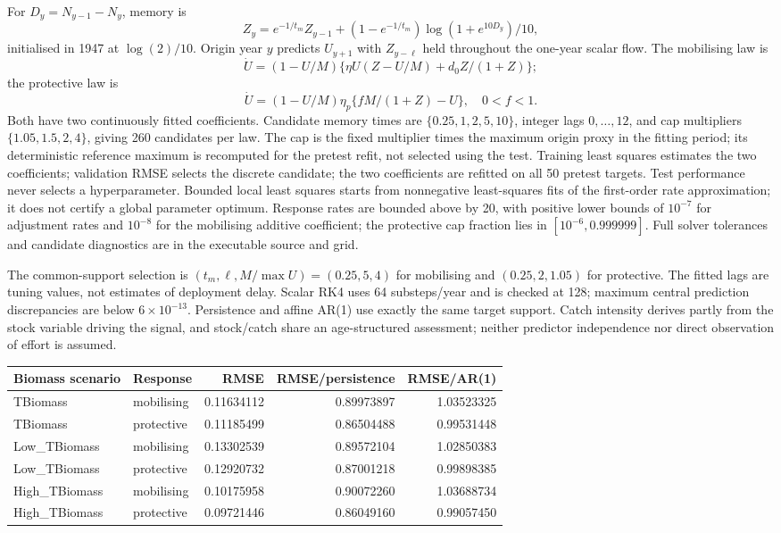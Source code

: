 \documentclass[
  10pt,
  a4paper,
]{article}
\begin{document}
For \(D_y=N_{y-1}-N_y\), memory is
\[Z_y=e^{-1/t_m}Z_{y-1}+(1-e^{-1/t_m})\log(1+e^{10D_y})/10,\]
initialised in 1947 at \(\log(2)/10\). Origin year \(y\) predicts
\(U_{y+1}\) with \(Z_{y-\ell}\) held throughout the one-year scalar
flow. The mobilising law is
\[\dot U=(1-U/M)\{\eta U(Z-U/M)+d_0Z/(1+Z)\};\] the protective law is
\[\dot U=(1-U/M)\eta_p\{fM/(1+Z)-U\},\quad0<f<1.\] Both have two
continuously fitted coefficients. Candidate memory times are
\(\{0.25,1,2,5,10\}\), integer lags \(0,\ldots,12\), and cap multipliers
\(\{1.05,1.5,2,4\}\), giving 260 candidates per law. The cap is the
fixed multiplier times the maximum origin proxy in the fitting period;
its deterministic reference maximum is recomputed for the pretest refit,
not selected using the test. Training least squares estimates the two
coefficients; validation RMSE selects the discrete candidate; the two
coefficients are refitted on all 50 pretest targets. Test performance
never selects a hyperparameter. Bounded local least squares starts from
nonnegative least-squares fits of the first-order rate approximation; it
does not certify a global parameter optimum. Response rates are bounded
above by 20, with positive lower bounds of \(10^{-7}\) for adjustment
rates and \(10^{-8}\) for the mobilising additive coefficient; the
protective cap fraction lies in \([10^{-6},0.999999]\). Full solver
tolerances and candidate diagnostics are in the executable source and
grid.

The common-support selection is \((t_m,\ell,M/\max U)=(0.25,5,4)\) for
mobilising and \((0.25,2,1.05)\) for protective. The fitted lags are
tuning values, not estimates of deployment delay. Scalar RK4 uses 64
substeps/year and is checked at 128; maximum central prediction
discrepancies are below \(6\times10^{-13}\). Persistence and affine
AR(1) use exactly the same target support. Catch intensity derives
partly from the stock variable driving the signal, and stock/catch share
an age-structured assessment; neither predictor independence nor direct
observation of effort is assumed.

\begin{longtable}[]{@{}llrrr@{}}
\toprule\noalign{}
Biomass scenario & Response & RMSE & RMSE/persistence & RMSE/AR(1) \\
\midrule\noalign{}
\endhead
\bottomrule\noalign{}
\endlastfoot
TBiomass & mobilising & 0.11634112 & 0.89973897 & 1.03523325 \\
TBiomass & protective & 0.11185499 & 0.86504488 & 0.99531448 \\
Low\_TBiomass & mobilising & 0.13302539 & 0.89572104 & 1.02850383 \\
Low\_TBiomass & protective & 0.12920732 & 0.87001218 & 0.99898385 \\
High\_TBiomass & mobilising & 0.10175958 & 0.90072260 & 1.03688734 \\
High\_TBiomass & protective & 0.09721446 & 0.86049160 & 0.99057450 \\
\end{longtable}
\end{document}
